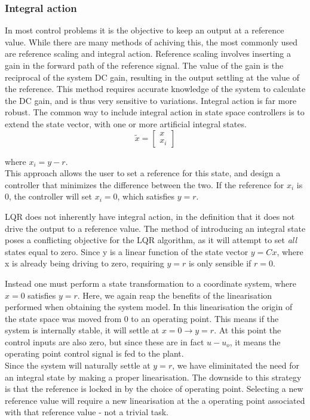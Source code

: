 \subsubsection{Integral action}
In most control problems it is the objective to keep an output at a reference value. While there are many methods of achiving this, the most commonly used are reference scaling and integral action. Reference scaling involves inserting a gain in the forward path of the reference signal. The value of the gain is the reciprocal of the system DC gain, resulting in the output settling at the value of the reference. This method requires accurate knowledge of the system to calculate the DC gain, and is thus very sensitive to variations. Integral action is far more robust. The common way to include integral action in state space controllers is to extend the state vector, with one or more artificial integral states.
\begin{equation} \label{eq:ricatti}
	\tilde{x} = \begin{bmatrix}
		x \\ x_i
	\end{bmatrix}
\end{equation}

where $x_i = y-r$.\\

This approach allows the user to set a reference for this state, and design a controller that minimizes the difference between the two. If the reference for $x_i$ is 0, the controller will set $x_i = 0$, which satisfies $y = r$. 

LQR does not inherently have integral action, in the definition that it does not drive the output to a reference value. The method of introducing an integral state poses a conflicting objective for the LQR algorithm, as it will attempt to set \textit{all} states equal to zero. Since y is a linear function of the state vector $y = Cx$, where x is already being driving to zero, requiring $y=r$ is only sensible if $r=0$.

Instead one must perform a state transformation to a coordinate system, where $x=0$ satisfies $y=r$. Here, we again reap the benefits of the linearisation performed when obtaining the system model. In this linearisation the origin of the state space was moved from 0 to an operating point. This means if the system is internally stable, it will settle at $x=0 \rightarrow y=r$. At this point the control inputs are also zero, but since these are in fact $u-u_o$, it means the operating point control signal is fed to the plant. \\
Since the system will naturally settle at $y=r$, we have eliminitated the need for an integral state by making a proper linearisation. The downside to this strategy is that the reference is locked in by the choice of operating point. Selecting a new reference value will require a new linearisation at the a operating point associated with that reference value - not a trivial task. 

